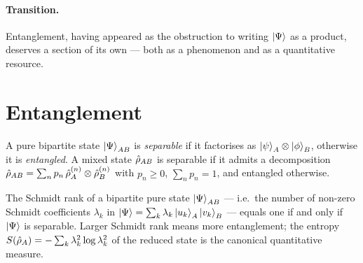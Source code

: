 \paragraph{Transition.}
Entanglement, having appeared as the obstruction to writing
$\ket{\Psi}$ as a product, deserves a section of its own --- both as
a phenomenon and as a quantitative resource.

\section{Entanglement}
\label{sec:entanglement}

\begin{definition}
\label{def:entanglement}
A pure bipartite state $\ket{\Psi}_{AB}$ is \emph{separable} if it
factorises as $\ket{\psi}_A\otimes\ket{\phi}_B$, otherwise it is
\emph{entangled}. A mixed state $\hat{\rho}_{AB}$ is separable if it
admits a decomposition
$\hat{\rho}_{AB}=\sum_n p_n\,\hat{\rho}_A^{(n)}\otimes\hat{\rho}_B^{(n)}$
with $p_n\geq0$, $\sum_n p_n=1$, and entangled otherwise.
\end{definition}

\begin{statement}
\label{stmt:schmidt}
The Schmidt rank of a bipartite pure state $\ket{\Psi}_{AB}$ ---
i.e.\ the number of non-zero Schmidt coefficients $\lambda_k$ in
$\ket{\Psi}=\sum_k\lambda_k\ket{u_k}_A\ket{v_k}_B$ --- equals one if
and only if $\ket{\Psi}$ is separable. Larger Schmidt rank means
more entanglement; the entropy $S(\hat{\rho}_A)=-\sum_k\lambda_k^2\log\lambda_k^2$
of the reduced state is the canonical quantitative measure.
\end{statement}

